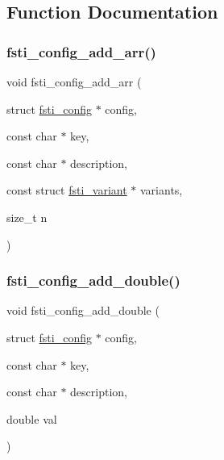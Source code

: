 \subsection{Function Documentation}
\mbox{\label{fsti-config_8h_a5d0a69eb0415adc0b32d29a92c002890}} 
\subsubsection{\texorpdfstring{fsti\+\_\+config\+\_\+add\+\_\+arr()}{fsti\_config\_add\_arr()}}
{\footnotesize\ttfamily void fsti\+\_\+config\+\_\+add\+\_\+arr (\begin{DoxyParamCaption}\item[{struct \mbox{\hyperlink{structfsti__config}{fsti\+\_\+config}} $\ast$}]{config,  }\item[{const char $\ast$}]{key,  }\item[{const char $\ast$}]{description,  }\item[{const struct \mbox{\hyperlink{structfsti__variant}{fsti\+\_\+variant}} $\ast$}]{variants,  }\item[{size\+\_\+t}]{n }\end{DoxyParamCaption})}

\mbox{\label{fsti-config_8h_ac687fc8ca6887aae337ce8ef4188f089}} 
\subsubsection{\texorpdfstring{fsti\+\_\+config\+\_\+add\+\_\+double()}{fsti\_config\_add\_double()}}
{\footnotesize\ttfamily void fsti\+\_\+config\+\_\+add\+\_\+double (\begin{DoxyParamCaption}\item[{struct \mbox{\hyperlink{structfsti__config}{fsti\+\_\+config}} $\ast$}]{config,  }\item[{const char $\ast$}]{key,  }\item[{const char $\ast$}]{description,  }\item[{double}]{val }\end{DoxyParamCaption})}

